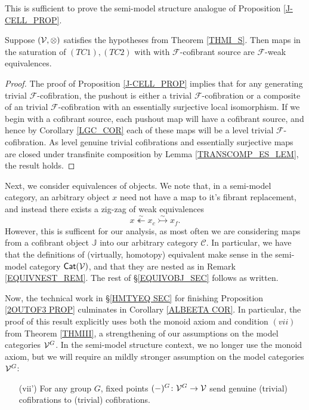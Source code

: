 \documentclass[a4paper,10pt
]{article}%
\renewcommand{\F}{\mathcal F}
\renewcommand{\1}{\eta}%
\begin{document}

This is sufficient to prove the semi-model structure analogue of Proposition \ref{J-CELL_PROP}.

\begin{proposition}
      Suppose $(\mathcal V,\otimes)$ satisfies the hypotheses from Theorem \ref{THMI_S}.
      Then maps in the saturation of $(TC1),(TC2)$ with with $\F$-cofibrant source are $\F$-weak equivalences.
\end{proposition}
\begin{proof}
	The proof of Proposition \ref{J-CELL_PROP} implies that for any generating trivial $\F$-cofibration,
	the pushout is either a trivial $\F$-cofibration or a composite of an trivial $\F$-cofibration with an essentially surjective local isomorphism.
	If we begin with a cofibrant source, each pushout map will have a cofibrant source,
	and hence by Corollary \ref{LGC_COR} each of these maps will be a level trivial $\F$-cofibration.
        As level genuine trivial cofibrations and essentially surjective maps are closed under transfinite composition by Lemma \ref{TRANSCOMP_ES_LEM},
        the result holds.
\end{proof}



Next, we consider equivalences of objects.
We note that, in a semi-model category, an arbitrary object $x$ need not have a map to it's fibrant replacement,
and instead there exists a zig-zag of weak equivalences
\[
      x \overset{\sim}{\twoheadleftarrow} x_c \overset{\sim}{\rightarrowtail} x_f.
\]
However, this is sufficent for our analysis, as most often we are considering maps from a cofibrant object $\mathbb J$ into our arbitrary category $\mathcal C$.
In particular, we have that the definitions of (virtually, homotopy) equivalent make sense in the semi-model category $\mathsf{Cat}(\mathcal V)$,
and that they are nested as in Remark \ref{EQUIVNEST_REM}.
The rest of \S \ref{EQUIVOBJ_SEC} follows as written.

Now, the technical work in \S \ref{HMTYEQ SEC} for finishing Proposition \ref{2OUTOF3 PROP} culminates in Corollary \ref{ALBEETA COR}.
In particular, the proof of this result explicitly uses both the monoid axiom and
condition $(vii)$ from Theorem \ref{THMIII}, a strengthening of our assumptions on the model categories $\mathcal V^G$.
In the semi-model structure context, we no longer use the monoid axiom,
but we will require an mildly stronger assumption on the model categories $\mathcal V^G$:
\begin{itemize}
\item[(vii')] For any group $G$, fixed points $(-)^G \colon \mathcal V^G \to \mathcal V$ send genuine (trivial) cofibrations to (trivial) cofibrations.
\end{itemize}
\end{document}
